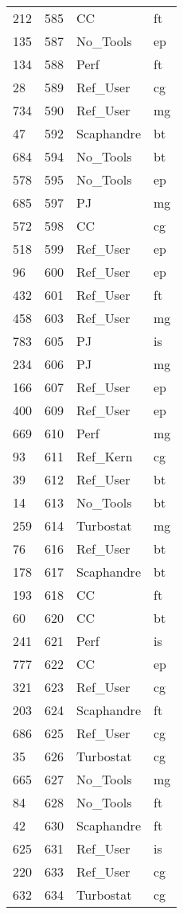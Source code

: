 \begin{tabular}{lrll}
212 & 585 & CC & ft \\
135 & 587 & No_Tools & ep \\
134 & 588 & Perf & ft \\
28 & 589 & Ref_User & cg \\
734 & 590 & Ref_User & mg \\
47 & 592 & Scaphandre & bt \\
684 & 594 & No_Tools & bt \\
578 & 595 & No_Tools & ep \\
685 & 597 & PJ & mg \\
572 & 598 & CC & cg \\
518 & 599 & Ref_User & ep \\
96 & 600 & Ref_User & ep \\
432 & 601 & Ref_User & ft \\
458 & 603 & Ref_User & mg \\
783 & 605 & PJ & is \\
234 & 606 & PJ & mg \\
166 & 607 & Ref_User & ep \\
400 & 609 & Ref_User & ep \\
669 & 610 & Perf & mg \\
93 & 611 & Ref_Kern & cg \\
39 & 612 & Ref_User & bt \\
14 & 613 & No_Tools & bt \\
259 & 614 & Turbostat & mg \\
76 & 616 & Ref_User & bt \\
178 & 617 & Scaphandre & bt \\
193 & 618 & CC & ft \\
60 & 620 & CC & bt \\
241 & 621 & Perf & is \\
777 & 622 & CC & ep \\
321 & 623 & Ref_User & cg \\
203 & 624 & Scaphandre & ft \\
686 & 625 & Ref_User & cg \\
35 & 626 & Turbostat & cg \\
665 & 627 & No_Tools & mg \\
84 & 628 & No_Tools & ft \\
42 & 630 & Scaphandre & ft \\
625 & 631 & Ref_User & is \\
220 & 633 & Ref_User & cg \\
632 & 634 & Turbostat & cg \\

\end{tabular}
